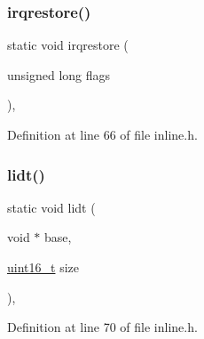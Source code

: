 \subsubsection{\texorpdfstring{irqrestore()}{irqrestore()}}
{\footnotesize\ttfamily static void irqrestore (\begin{DoxyParamCaption}\item[{unsigned long}]{flags }\end{DoxyParamCaption})\hspace{0.3cm}{\ttfamily [inline]}, {\ttfamily [static]}}



Definition at line 66 of file inline.\+h.


\mbox{\label{a00077_a31967dec32575d3d398e6d289e888d1f_a31967dec32575d3d398e6d289e888d1f}} 
\subsubsection{\texorpdfstring{lidt()}{lidt()}}
{\footnotesize\ttfamily static void lidt (\begin{DoxyParamCaption}\item[{void $\ast$}]{base,  }\item[{\hyperlink{a00068_a273cf69d639a59973b6019625df33e30_a273cf69d639a59973b6019625df33e30}{uint16\+\_\+t}}]{size }\end{DoxyParamCaption})\hspace{0.3cm}{\ttfamily [inline]}, {\ttfamily [static]}}



Definition at line 70 of file inline.\+h.


